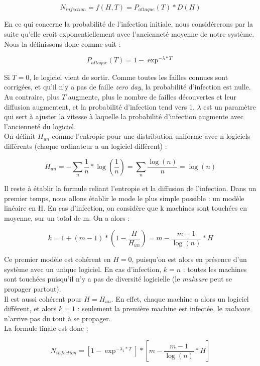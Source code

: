 \[
N_{infection} = f(H,T) = P_{attaque}(T)*D(H)
\]

En ce qui concerne la probabilité de l'infection initiale, nous considérerons par la suite qu'elle croit exponentiellement avec l'ancienneté moyenne de notre système. Nous la définissons donc comme suit :

\[
P_{attaque}(T) =1- \exp^{-\lambda*T}
\]

Si $T=0$, le logiciel vient de sortir. Comme toutes les failles connues sont corrigées, et qu'il n'y a pas de faille \textit{zero day}, la probabilité d'infection est nulle. Au contraire, plus $T$ augmente, plus le nombre de failles découvertes et leur diffusion augmentent, et la probabilité d'infection tend vers 1. $\lambda$ est un paramètre qui sert à ajuster la vitesse à laquelle la probabilité d'infection augmente avec l'ancienneté du logiciel.\\

On définit $H_{un}$ comme l'entropie pour une distribution uniforme avec n logiciels différents (chaque ordinateur a un logiciel différent) :

\[
H_{un} = -\sum_n \frac{1}{n} * \log(\frac{1}{n}) = \sum_n \frac{\log(n)}{n} = \log(n)
\]

Il reste à établir la formule reliant l'entropie et la diffusion de l'infection. Dans un premier temps, nous allons établir le mode le plus simple possible : un modèle linéaire en H. En cas d'infection, on considère que k machines sont touchées en moyenne, sur un total de m. On a alors :

\[
k=1+(m-1)*(1-\frac{H}{H_{un}}) =m-\frac{m-1}{\log(n)}*H
\]

Ce premier modèle est cohérent en $H=0$, puisqu'on est alors en présence d'un système avec un unique logiciel. En cas d'infection, $k=n$ : toutes les machines sont touchées puisqu'il n'y a pas de diversité logicielle (le \textit{malware} peut se propager partout).\\
Il est aussi cohérent pour $H=H_{un}$. En effet, chaque machine a alors un logiciel différent, et alors $k=1$ : seulement la première machine est infectée, le \textit{malware} n'arrive pas du tout à se propager.\\
La formule finale est donc :


\[
N_{infection}=[1-\exp^{-\lambda_1*T}] * [m-\frac{m-1}{\log(n)}*H]
\]


